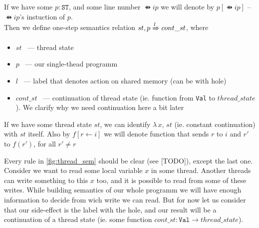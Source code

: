 If we have some $p : \texttt{ST}$, and some line number $\ffun{ip}$ we will denote by $p[\ffun{ip}]$ -- $\ffun{ip}$'s instuction of $p$. \\
Then we define one-step semantics relation $st, p \xRightarrow{l} cont\_st$, where
\begin{itemize}
  \item $st$ ~--- thread state
  \item $p$ ~--- our single-thead programm
  \item $l$ ~--- label that denotes action on shared memory (can be with hole)
  \item $cont\_st$ ~--- continuation of thread state (ie. function from \texttt{Val} to $thread\_state$). We clarify why we need continuation here a bit later
\end{itemize}
If we have some thread state $st$, we can identify $\lambda\, x,\, st$ (ie. constant continuation) with $st$ itself. Also by $f[r \leftarrow i]$ we will denote function that sends $r$ to $i$ and $r'$ to $f(r')$, for all $r' \neq r$



Every rule in \cref{fig:thread_sem} should be clear (see [TODO]), except the last one. Consider we want to read some local variable $x$ in some thread. Another threads can write something to this $x$ too, and it is possible to read from some of these writes. While building semantics of our whole programm we will have enough information to decide from wich write we can read. But for now let us consider that our side-effect is the label with the hole, and our result will be a continuation of a thread state (ie. some function $cont\_st : \texttt{Val} \to thread\_state$). 



